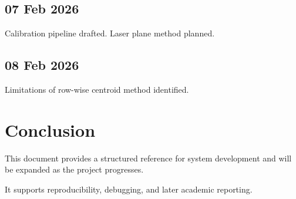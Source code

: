 \documentclass[11pt,a4paper]{article}
\begin{document}
\subsection*{07 Feb 2026}
Calibration pipeline drafted. Laser plane method planned.

\subsection*{08 Feb 2026}
Limitations of row-wise centroid method identified.

\section{Conclusion}

This document provides a structured reference for system development and will be expanded as the project progresses.

It supports reproducibility, debugging, and later academic reporting.
\end{document}
